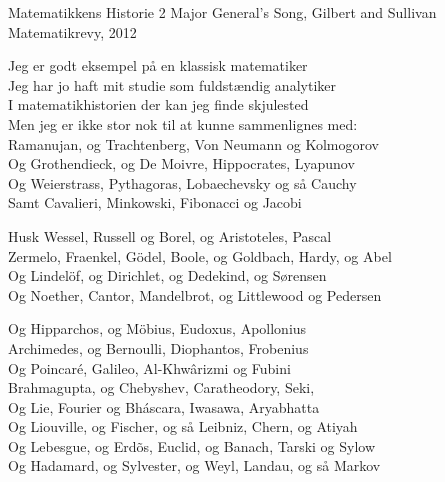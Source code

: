 \begin{song}{Matematikkens Historie 2}
  {} %
  {Major General's Song, Gilbert and Sullivan} %
  {} %
  {Matematikrevy, 2012} %
  {\NotCCLIed} %

  \begin{SBVerse}
    Jeg er godt eksempel på en klassisk matematiker\\
    Jeg har jo haft mit studie som fuldstændig analytiker\\
    I matematikhistorien der kan jeg finde skjulested\\
    Men jeg er ikke stor nok til at kunne sammenlignes med:\\
    Ramanujan, og Trachtenberg, Von Neumann og Kolmogorov\\
    Og Grothendieck, og De Moivre, Hippocrates, Lyapunov\\
    Og Weierstrass, Pythagoras, Lobaechevsky og så Cauchy\\
    Samt Cavalieri, Minkowski, Fibonacci og Jacobi 
  \end{SBVerse}

  \begin{SBVerse}
    Husk Wessel, Russell og Borel, og Aristoteles, Pascal\\
    Zermelo, Fraenkel, Gödel, Boole, og Goldbach, Hardy, og Abel\\
    Og Lindelöf, og Dirichlet, og Dedekind, og Sørensen\\
    Og Noether, Cantor, Mandelbrot, og Littlewood og Pedersen 
  \end{SBVerse}

  \begin{SBVerse}
    Og Hipparchos, og Möbius, Eudoxus, Apollonius\\
    Archimedes, og Bernoulli, Diophantos, Frobenius\\
    Og Poincaré, Galileo, Al-Khwârizmi og Fubini\\
    Brahmagupta, og Chebyshev, Caratheodory, Seki,\\
    Og Lie, Fourier og Bháscara, Iwasawa, Aryabhatta\\
    Og Liouville, og Fischer, og så Leibniz, Chern, og Atiyah\\
    Og Lebesgue, og Erdõs, Euclid, og Banach, Tarski og Sylow\\
    Og Hadamard, og Sylvester, og Weyl, Landau, og så Markov
  \end{SBVerse}


\end{song}
